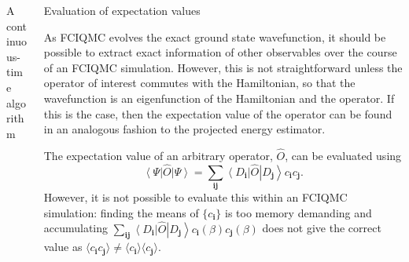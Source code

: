 \documentclass[final]{beamer} %
\newcommand{\ket}[1]{\left\vert#1\right\rangle}
\newcommand{\bra}[1]{\left\langle#1\right\vert}
\newcommand{\mean}[1]{\langle#1\rangle}
\newcommand{\Op}{\hat{O}}
\newcommand{\bi}{\mathbf{i}}
\newcommand{\bj}{\mathbf{j}}
\begin{document}
\begin{frame}[t]
\begin{columns}[t]
\begin{column}{0.9\paperwidth}
\begin{columns}[t]
\begin{column}{0.33\paperwidth}
\begin{block}{A continuous-time algorithm}
           \end{block}
           \end{column}
%
       \begin{column}{0.55\paperwidth}
           \begin{block}{Evaluation of expectation values}
           \begin{multicols}{2}
           As FCIQMC evolves the exact ground state wavefunction, it should be possible to extract exact information of other observables over the course of an FCIQMC simulation.  However, this is not straightforward unless the operator of interest commutes with the Hamiltonian, so that the wavefunction is an eigenfunction of the Hamiltonian and the operator.  If this is the case, then the expectation value of the operator can be found in an analogous fashion to the projected energy estimator.

           The expectation value of an arbitrary operator, $\Op$, can be evaluated using
           \begin{equation}
               \bra{\Psi}\Op\ket{\Psi} = \sum_{\bi\bj} \bra{D_\bi}\Op\ket{D_\bj} c_\bi c_\bj.
           \end{equation}
           However, it is not possible to evaluate this within an FCIQMC simulation: finding the means of $\{c_\bi\}$ is too memory demanding and accumulating $\sum_{\bi\bj} \bra{D_\bi}\Op\ket{D_\bj} c_\bi(\beta) c_\bj(\beta)$ does not give the correct value as $\mean{c_\bi c_\bj}\ne\mean{c_\bi}\mean{c_\bj}$.


\end{multicols}
\end{block}
\end{column}
\end{columns}
\end{column}
\end{columns}
\end{frame}
\end{document}
